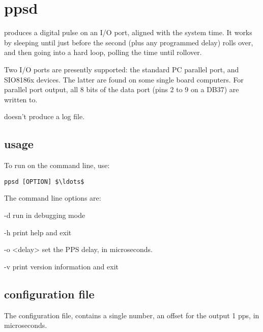 \section{ppsd \label{s:ppsd}}

 produces a digital pulse on an I/O port, aligned with the system time.
It works by sleeping until just before the second (plus any programmed delay) rolls over, 
and then going into a hard loop, polling the time until rollover.

Two I/O ports are presently supported: the standard PC parallel port, and SIO8186x devices.
The latter are found on some single board computers. For parallel port output, all 8 bits 
of the data port (pins 2 to 9 on a DB37) are written to.

 doesn't produce a log file.

\subsection{usage}

To run  on the command line, use:
\begin{lstlisting}[mathescape=true]
ppsd [OPTION] $\ldots$
\end{lstlisting}
The command line options are:
\begin{description*}
	\item[-d]	run in debugging mode
	\item[-h]	print help and exit
	\item[-o \textless delay\textgreater] set the PPS delay, in microseconds.
	\item[-v]	print version information and exit
\end{description*}

\subsection{configuration file}

The configuration file,  contains a single number, an offset for the output 1 pps, in microseconds.

